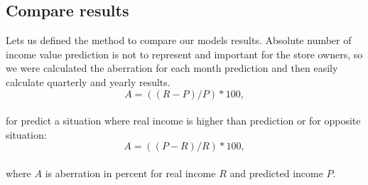 \subsection{Compare results} \label{subsec:matlab}
Lets us defined the method to compare our models results.
Absolute number of income value prediction is not to represent and important for the store owners, so we were calculated
the aberration for each month prediction and then easily calculate quarterly and yearly results.
\begin{equation} \label{eq:42}
A = ((R - P)/P) * 100,
\end{equation}\\
for predict a situation where real income is higher than prediction or for opposite situation:
\begin{equation} \label{eq:43}
A = ((P - R)/R) * 100,
\end{equation}\\
where $A$ is aberration in percent for real income $R$ and predicted income $P$.
